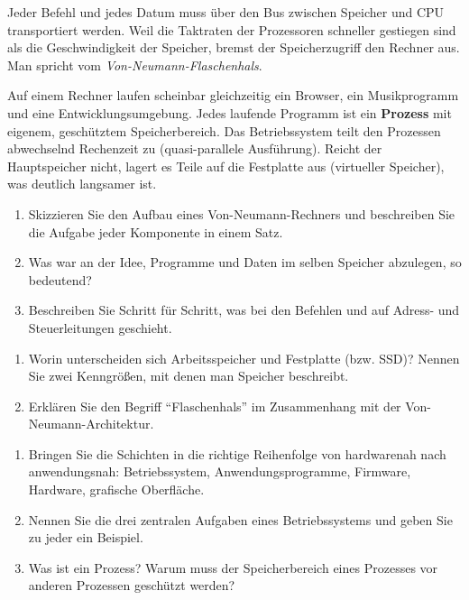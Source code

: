 Jeder Befehl und jedes Datum muss über den Bus zwischen Speicher und CPU transportiert werden. Weil die Taktraten der Prozessoren schneller gestiegen sind als die Geschwindigkeit der Speicher, bremst der Speicherzugriff den Rechner aus. Man spricht vom \emph{Von-Neumann-Flaschenhals}.

Auf einem Rechner laufen scheinbar gleichzeitig ein Browser, ein Musikprogramm und eine Entwicklungsumgebung. Jedes laufende Programm ist ein \textbf{Prozess} mit eigenem, geschütztem Speicherbereich. Das Betriebssystem teilt den Prozessen abwechselnd Rechenzeit zu (quasi-parallele Ausführung). Reicht der Hauptspeicher nicht, lagert es Teile auf die Festplatte aus (virtueller Speicher), was deutlich langsamer ist.

\aufgaben
{}
\begin{enumerate}[label=\alph*)]
\item Skizzieren Sie den Aufbau eines Von-Neumann-Rechners und beschreiben Sie die Aufgabe jeder Komponente in einem Satz.
\item Was war an der Idee, Programme und Daten im selben Speicher abzulegen, so bedeutend?
\item Beschreiben Sie Schritt für Schritt, was bei den Befehlen  und  auf Adress- und Steuerleitungen geschieht.
\end{enumerate}

\begin{enumerate}[label=\alph*)]
\item Worin unterscheiden sich Arbeitsspeicher und Festplatte (bzw. SSD)? Nennen Sie zwei Kenngrößen, mit denen man Speicher beschreibt.
\item Erklären Sie den Begriff \enquote{Flaschenhals} im Zusammenhang mit der Von-Neumann-Architektur.
\end{enumerate}

\begin{enumerate}[label=\alph*)]
\item Bringen Sie die Schichten in die richtige Reihenfolge von hardwarenah nach anwendungsnah: Betriebssystem, Anwendungsprogramme, Firmware, Hardware, grafische Oberfläche.
\item Nennen Sie die drei zentralen Aufgaben eines Betriebssystems und geben Sie zu jeder ein Beispiel.
\item Was ist ein Prozess? Warum muss der Speicherbereich eines Prozesses vor anderen Prozessen geschützt werden?
\end{enumerate}

